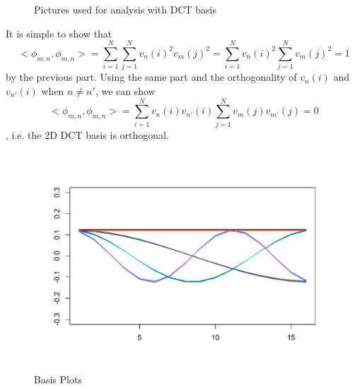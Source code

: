 \documentclass[12pt, leqno]{article}
\begin{document}
\begin{figure}
\centering
{}
\caption{Pictures used for analysis with DCT basis}
\end{figure}

It is simple to show that $$<\phi_{m,n},\phi_{m,n}> = \sum_{i = 1}^N
\sum_{j = 1}^N v_n(i)^2 v_m(j)^2 = \sum_{i = 1}^N  v_n(i)^2 \sum_{j =
  1}^N v_m(j)^2 = 1$$ by the previous part. Using the same part and
the orthogonality of $v_n(i)$ and $v_{n'}(i)$ when $n \neq n'$, we can
show  $$<\phi_{m,n},\phi_{m,n}>  = \sum_{i = 1}^N v_n(i) v_{n'}(i)
\sum_{j = 1}^N  v_m(j) v_{m'}(j) = 0$$, i.e. the 2D DCT basis is
orthogonal. 

\begin{figure}[H]
\begin{center}
  \includegraphics[scale=0.65]{basisplots.pdf}
\end{center}
\caption{Basis Plots} 
\label{fig:basisplots}
\end{figure}
\end{document}
